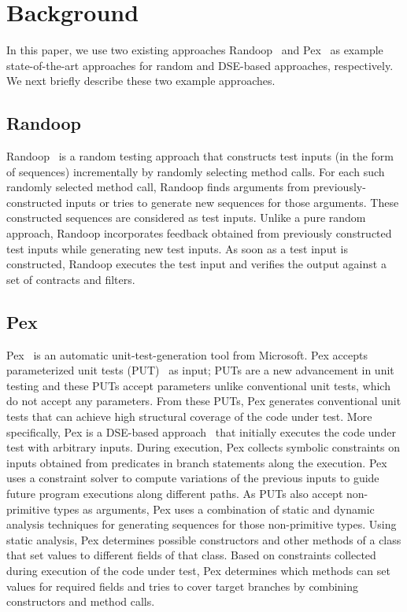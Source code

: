 \section{Background}
\label{sec:background}

In this paper, we use two existing approaches Randoop~\cite{pacheco:feedback} and Pex~\cite{tillman:pexwhite} as example state-of-the-art approaches for random and DSE-based approaches, respectively. We next briefly describe these two example approaches.

\subsection{Randoop}

Randoop~\cite{pacheco:feedback} is a random testing approach that constructs test inputs (in the form of sequences) incrementally by randomly selecting method calls. For each such randomly selected method call, Randoop finds arguments from previously-constructed inputs or tries to generate new sequences for those arguments. These constructed sequences are considered as test inputs. Unlike a pure random approach, Randoop incorporates feedback obtained from previously constructed test inputs while generating new test inputs. As soon as a test input is constructed, Randoop executes the test input and verifies the output against a set of contracts and filters. 

\subsection{Pex}
\label{sec:pex}
Pex~\cite{tillman:pexwhite} is an automatic unit-test-generation tool from Microsoft. Pex accepts parameterized unit tests (PUT)~\cite{tillmann05:parameterized} as input; PUTs are a new advancement in unit testing and these PUTs accept parameters unlike conventional unit tests, which do not accept any parameters. From these PUTs, Pex generates conventional unit tests that can achieve high structural coverage of the code under test. More specifically, Pex is a DSE-based approach~\cite{godefroid:dart} that initially executes the code under test with arbitrary inputs. During execution, Pex collects symbolic constraints on inputs obtained from predicates in branch statements along the execution. Pex uses a constraint solver to compute variations of the previous inputs to guide future program executions along different paths. As PUTs also accept non-primitive types as arguments, Pex uses a combination of static and dynamic analysis techniques for generating sequences for those non-primitive types. Using static analysis, Pex determines possible constructors and other methods of a class that set values to different fields of that class. Based on constraints collected during execution of the code under test, Pex determines which methods can set values for required fields and tries to cover target branches by combining constructors and method calls.